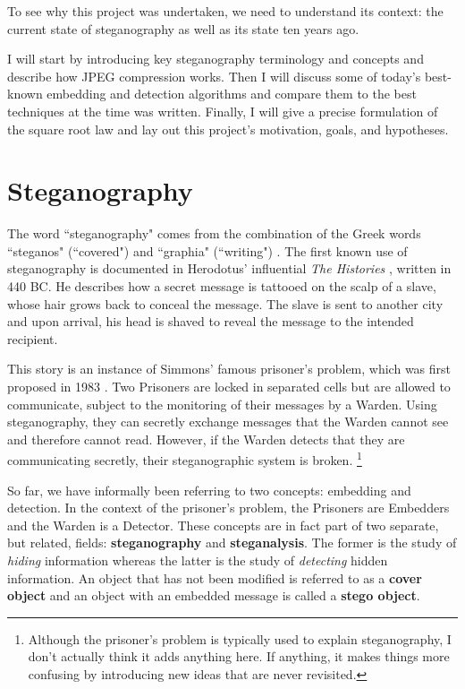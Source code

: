 \documentclass[11pt,a4paper,twoside,openright]{report}
\begin{document}
To see why this project was undertaken, we need to understand its context: the current state of steganography as well as its state ten years ago.

I will start by introducing key steganography terminology and concepts and describe how JPEG compression works. Then I will discuss some of today's best-known embedding and detection algorithms and compare them to the best techniques at the time \cite{2008-paper} was written. Finally, I will give a precise formulation of the square root law and lay out this project's motivation, goals, and hypotheses.


\section{Steganography} \label{sec:steganography}

The word ``steganography" comes from the combination of the Greek words ``steganos" (``covered") and ``graphia" (``writing") \cite{textbook}. The first known use of steganography \cite[\S 1.1]{textbook} is documented in Herodotus' influential \textit{The Histories} \cite{herodotus}, written in 440 BC. He describes how a secret message is tattooed on the scalp of a slave, whose hair grows back to conceal the message. The slave is sent to another city and upon arrival, his head is shaved to reveal the message to the intended recipient.

This story is an instance of Simmons' famous prisoner's problem, which was first proposed in 1983 \cite{prisoners-problem}. Two Prisoners are locked in separated cells but are allowed to communicate, subject to the monitoring of their messages by a Warden. Using steganography, they can secretly exchange messages that the Warden cannot see and therefore cannot read. However, if the Warden detects that they are communicating secretly, their steganographic system is broken.
\footnote{Although the prisoner's problem is typically used to explain steganography, I don't actually think it adds anything here. If anything, it makes things more confusing by introducing new ideas that are never revisited.} %

So far, we have informally been referring to two concepts: embedding and detection. In the context of the prisoner's problem, the Prisoners are Embedders and the Warden is a Detector. These concepts are in fact part of two separate, but related, fields: \textbf{steganography} and \textbf{steganalysis}. The former is the study of \textit{hiding} information whereas the latter is the study of \textit{detecting} hidden information. An object that has not been modified is referred to as a \textbf{cover object} and an object with an embedded message is called a \textbf{stego object}.
\end{document}
